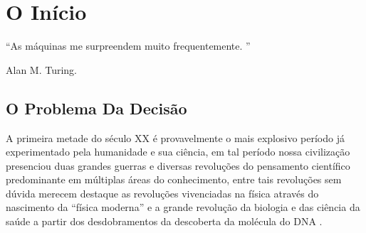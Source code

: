 \chapter{O Início}\label{cap:InicioComputabilidadeDecidibildiade}


\epigraph{``As máquinas me surpreendem muito frequentemente. ''}{Alan M. Turing.}



\section{O Problema Da Decisão}

A primeira metade do século XX é provavelmente o mais explosivo período já experimentado pela humanidade e sua ciência, em tal período nossa civilização presenciou duas grandes guerras e diversas revoluções do pensamento científico predominante em múltiplas áreas do conhecimento, entre tais revoluções sem dúvida merecem destaque as revoluções vivenciadas na física através do nascimento da ``física moderna'' \cite{bohr1937, dirac1981, einstein1905a, einstein1912b, einstein2005, schrodinger1926, einstein1905b} e a grande revolução da biologia e das ciência da saúde a partir dos desdobramentos da descoberta da molécula do DNA \cite{watson1953}.

